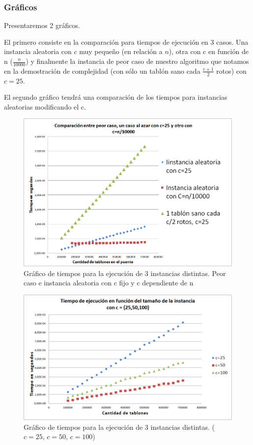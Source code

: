 \subsubsection{Gráficos}

Presentaremos 2 gráficos. 

El primero consiste en la comparación para tiempos de ejecución en 3 casos. Una instancia aleatoria con $c$ muy pequeño (en relación a $n$), otra con c en función de n ($\frac{n}{10000}$) y finalmente la instancia de peor caso de nuestro algoritmo que notamos en la demostración de complejidad (con sólo un tablón sano cada $\frac{c+1}{2}$ rotos) con $c=25$.

El segundo gráfico tendrá una comparación de los tiempos para instancias aleatorias modificando el c.

\begin{figure}[H]
\includegraphics[scale=0.5]{ej1/graph_1.png}
\caption{Gráfico de tiempos para la ejecución de 3 instancias distintas. Peor caso e instancia aleatoria con c fijo y c dependiente de n}
\end{figure}

\begin{figure}[H]
\includegraphics[scale=0.5]{ej1/graph_2.png}
\caption{Gráfico de tiempos para la ejecución de 3 instancias distintas. ($c=25$, $c=50$, $c=100$)}
\end{figure}

